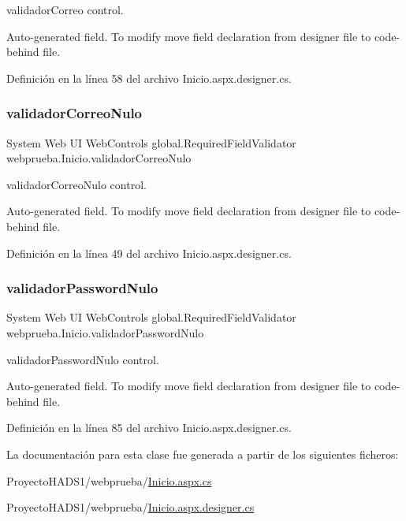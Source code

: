 validador\+Correo control. 

Auto-\/generated field. To modify move field declaration from designer file to code-\/behind file. 

Definición en la línea 58 del archivo Inicio.\+aspx.\+designer.\+cs.

\mbox{\label{classwebprueba_1_1_inicio_af5a8fe42f19dccc296ea067be723f15a}} 
\subsubsection{\texorpdfstring{validadorCorreoNulo}{validadorCorreoNulo}}
{\footnotesize\ttfamily System Web UI Web\+Controls global.\+Required\+Field\+Validator webprueba.\+Inicio.\+validador\+Correo\+Nulo\hspace{0.3cm}{\ttfamily [protected]}}



validador\+Correo\+Nulo control. 

Auto-\/generated field. To modify move field declaration from designer file to code-\/behind file. 

Definición en la línea 49 del archivo Inicio.\+aspx.\+designer.\+cs.

\mbox{\label{classwebprueba_1_1_inicio_aab7a4ebb559f60eaf4e9964411639d8c}} 
\subsubsection{\texorpdfstring{validadorPasswordNulo}{validadorPasswordNulo}}
{\footnotesize\ttfamily System Web UI Web\+Controls global.\+Required\+Field\+Validator webprueba.\+Inicio.\+validador\+Password\+Nulo\hspace{0.3cm}{\ttfamily [protected]}}



validador\+Password\+Nulo control. 

Auto-\/generated field. To modify move field declaration from designer file to code-\/behind file. 

Definición en la línea 85 del archivo Inicio.\+aspx.\+designer.\+cs.



La documentación para esta clase fue generada a partir de los siguientes ficheros\+:\begin{DoxyCompactItemize}
\item 
Proyecto\+H\+A\+D\+S1/webprueba/\mbox{\hyperlink{_proyecto_h_a_d_s1_2webprueba_2_inicio_8aspx_8cs}{Inicio.\+aspx.\+cs}}\item 
Proyecto\+H\+A\+D\+S1/webprueba/\mbox{\hyperlink{_proyecto_h_a_d_s1_2webprueba_2_inicio_8aspx_8designer_8cs}{Inicio.\+aspx.\+designer.\+cs}}\end{DoxyCompactItemize}
